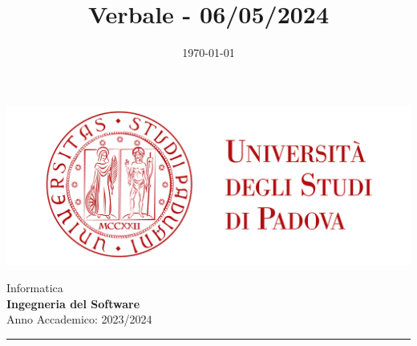 \documentclass[5pt]{article}
\title{ Verbale - 06/05/2024 }
\date{\today}
\begin{document}


    \vspace{8pt}
    \includegraphics[scale=0.2]{UNIPDFull.png}

\vspace{10pt}

\begin{minipage}[t]{0.48\textwidth}
        \begin{flushleft}
            Informatica\\
            \vspace{5pt}
            \textbf{\LARGE Ingegneria del Software}\\
            Anno Accademico: 2023/2024
        \end{flushleft}
\end{minipage}


\vspace{5px}


\rule{\textwidth}{5pt}
\end{document}

